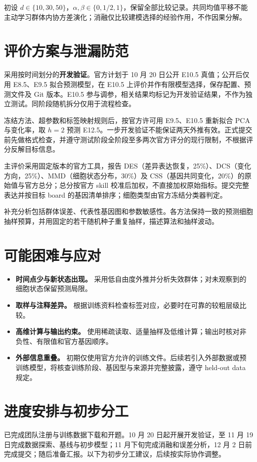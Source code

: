 \documentclass[UTF8,zihao=-4,fontset=none,a4paper]{ctexart}
\begin{document}
初设 $d\in\{10,30,50\}$，$\alpha,\beta\in\{0,1/2,1\}$，保留全部比较记录。共同均值平移不能主动学习群体内协方差演化；消融仅比较建模选择的经验作用，不作因果分解。

\section{评价方案与泄漏防范}
采用按时间划分的\textbf{开发验证}。官方计划于 10 月 20 日公开 E10.5 真值\cite{timeline}；公开后仅用 E8.5、E9.5 拟合预测模型，在 E10.5 上评价并作有限模型选择，保存配置、预测文件及 Git 版本。E10.5 参与调参，相关结果均标记为开发验证结果，不作为独立测试。同阶段随机拆分仅用于流程检查。

冻结方法、超参数和标签映射规则后，按官方许可用 E9.5、E10.5 重新拟合 PCA 与变化率，取 $h=2$ 预测 E12.5。一步开发验证不能保证两天外推有效。正式提交前先做格式检查，并遵守测试阶段全阶段至多两次官方评分的现行限制，不根据评分反解目标信息\cite{rules}。

主评价采用固定版本的官方工具，报告 DES（差异表达恢复，25\%）、DCS（变化方向，25\%）、MMD（细胞状态分布，30\%）及 CSS（基因共同变化，20\%）的原始值与官方总分；总分按官方 skill 校准后加权，不直接加权原始指标\cite{evaluation}。提交完整表达并按目标 board 的基因清单排序；细胞类型由官方冻结分类器判定。

补充分析包括群体误差、代表性基因图和参数敏感性。各方法保持一致的预测细胞抽样预算，并用固定的若干随机种子重复抽样，描述算法和抽样波动。

\newpage
\section{可能困难与应对}
\begin{itemize}
  \item \textbf{时间点少与新状态出现。} 采用低自由度外推并分析失效群体；对未观察到的细胞状态保留预测局限。
  \item \textbf{取样与注释差异。} 根据训练资料检查标签对应，必要时在可靠的较粗层级比较。
  \item \textbf{高维计算与输出约束。} 使用稀疏读取、适量抽样及低维计算；输出时核对非负性、有限值和官方基因顺序。
  \item \textbf{外部信息重叠。} 初期仅使用官方允许的训练文件。后续若引入外部数据或预训练模型，将核查训练阶段、基因型与来源并完整披露，遵守 held-out data 规定\cite{rules}。
\end{itemize}

\section{进度安排与初步分工}
已完成团队注册与训练数据下载和开题。10 月 20 日起开展开发验证，至 11 月 19 日完成数据探索、基线与初步模型；11 月下旬完成消融和误差分析，12 月 2 日前完成提交；随后准备汇报。以下为初步分工建议，后续按实际协作调整。
\end{document}
